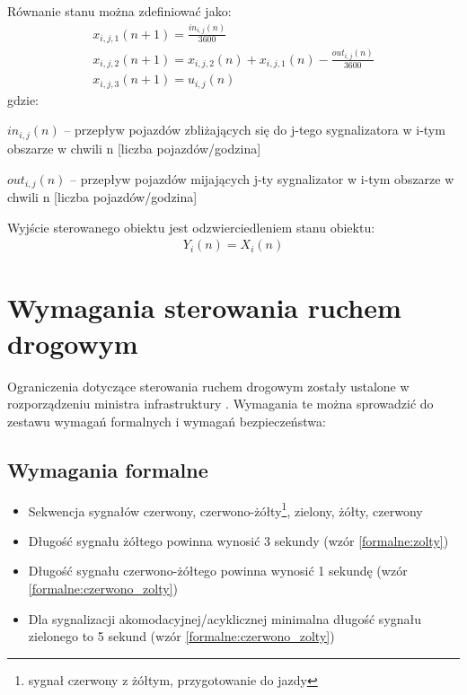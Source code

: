 \vspace{0.5cm}
Równanie stanu można zdefiniować jako:
\begin{equation}
	\begin{array}{c}
		x_{i, j, 1} (n+1) = \frac{in_{i, j} (n)}{3600} \\
		x_{i, j, 2} (n+1) = x_{i, j, 2} (n) + x_{i, j, 1} (n) - \frac{out_{i, j} (n)}{3600}\\
		x_{i, j, 3} (n+1) = u_{i, j} (n)
	\end{array}
\end{equation}
gdzie:

\begin{math} in_{i, j} (n) \end{math} \textrm{ -- przepływ pojazdów zbliżających się do j-tego sygnalizatora w i-tym obszarze w chwili n [liczba pojazdów/godzina]}

\begin{math} out_{i, j} (n) \end{math} \textrm{ -- przepływ pojazdów mijających j-ty sygnalizator w i-tym obszarze w chwili n [liczba pojazdów/godzina]}

\vspace{0.5cm}
Wyjście sterowanego obiektu jest odzwierciedleniem stanu obiektu:
\begin{equation}
	\begin{array}{c}
		Y_i (n) = X_i (n)
	\end{array}
\end{equation}


\section{Wymagania sterowania ruchem drogowym}
\label{sec:model_ograniczenia}
Ograniczenia dotyczące sterowania ruchem drogowym zostały ustalone w rozporządzeniu ministra infrastruktury \cite{rozporzadzenie}. Wymagania te można sprowadzić do zestawu wymagań formalnych i wymagań bezpieczeństwa:
\subsection{Wymagania formalne}
\begin{itemize}
	\item Sekwencja sygnałów czerwony, czerwono-żółty\footnote{sygnał czerwony z żółtym, przygotowanie do jazdy}, zielony, żółty, czerwony
	\item Długość sygnału żółtego powinna wynosić 3 sekundy (wzór \ref{formalne:zolty})
	\item Długość sygnału czerwono-żółtego powinna wynosić 1 sekundę (wzór \ref{formalne:czerwono_zolty})
	\item Dla sygnalizacji akomodacyjnej/acyklicznej minimalna długość sygnału zielonego to 5 sekund (wzór \ref{formalne:czerwono_zolty})
\end{itemize}

